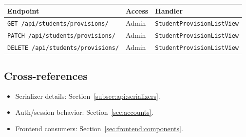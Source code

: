 \begin{longtable}{p{}p{}p{}}
\toprule
\textbf{Endpoint} & \textbf{Access} & \textbf{Handler} \\
\midrule
\texttt{GET /api/students/provisions/} & Admin & \texttt{StudentProvisionListView} \\
\texttt{PATCH /api/students/provisions/} & Admin & \texttt{StudentProvisionListView} \\
\texttt{DELETE /api/students/provisions/} & Admin & \texttt{StudentProvisionListView} \\
\bottomrule
\end{longtable}

\subsection{Cross-references}
\label{subsec:api:endpoints:links}

\begin{itemize}
  \item Serializer details: Section~\ref{subsec:api:serializers}.
  \item Auth/session behavior: Section~\ref{sec:accounts}.
  \item Frontend consumers: Section~\ref{sec:frontend:components}.
\end{itemize}
